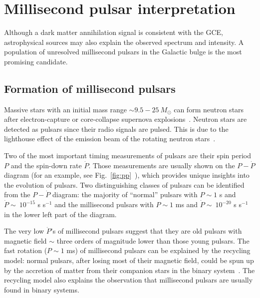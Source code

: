 \documentclass[doublespace,nopageskip]{VTthesis} %
\begin{document}

\section{Millisecond pulsar interpretation}

Although a dark matter annihilation signal is consistent with the GCE,  astrophysical sources may also explain the observed spectrum and intensity. A population of unresolved millisecond pulsars in the Galactic bulge is the most promising candidate.

\subsection{Formation of millisecond pulsars}

Massive stars with an initial mass range $\sim 9.5 - 25\ M_\odot$ can form neutron stars after electron-capture or core-collapse supernova explosions~\cite{2014PASA...31...30K}. Neutron stars are detected as pulsars since their radio signals are pulsed. This is due to the lighthouse effect of the emission beam of the rotating neutron stars~\cite{2004hpa..book.....L}.

Two of the most important timing measurements of pulsars are their spin period $P$ and the spin-down rate $\dot{P}$. Those measurements are usually shown on the $P-\dot{P}$ diagram (for an example, see Fig.~\ref{fig:pp}~\cite{2011AIPC.1357..269T,2005AJ....129.1993M}), which provides unique insights into the evolution of pulsars. Two distinguishing classes of pulsars can be identified from the $P-\dot{P}$ diagram: the majority of ``normal'' pulsars with $P \sim 1$ s and $\dot{P} \sim\ 10^{-15}$ s s$^{-1}$ and the millisecond pulsars  with $P \sim 1$ ms and $\dot{P} \sim\ 10^{-20}$ s s$^{-1}$ in the lower left part of the diagram.

The very low $\dot{P}$'s of millisecond pulsars suggest that they are old pulsars with magnetic field $\sim$ three orders of magnitude lower than those young pulsars. The fast rotation ($P \sim 1$ ms) of millisecond pulsars can be explained by the recycling model: normal pulsars, after losing most of their magnetic field, could be spun up by the accretion of matter from their companion stars in the binary system~\cite{1982Natur.300..728A,1998Natur.394..344W}. The recycling model also explains the observation that millisecond pulsars are usually found in binary systems.
\end{document}
